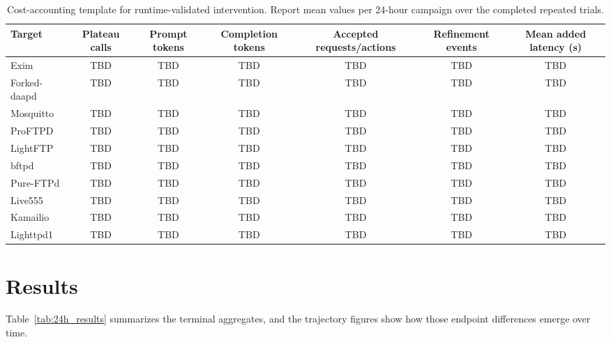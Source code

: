 \documentclass[conference]{IEEEtran}
\begin{document}
\begin{table}[t]
\centering
\caption{Cost-accounting template for runtime-validated intervention. Report mean values per 24-hour campaign over the completed repeated trials.}
\label{tab:cost_breakdown_template}
\scriptsize
\begin{tabular}{l|c c c c c c}
\toprule
Target & Plateau calls & Prompt tokens & Completion tokens & Accepted requests/actions & Refinement events & Mean added latency (s) \\
\midrule
Exim & TBD & TBD & TBD & TBD & TBD & TBD \\
Forked-daapd & TBD & TBD & TBD & TBD & TBD & TBD \\
Mosquitto & TBD & TBD & TBD & TBD & TBD & TBD \\
ProFTPD & TBD & TBD & TBD & TBD & TBD & TBD \\
LightFTP & TBD & TBD & TBD & TBD & TBD & TBD \\
bftpd & TBD & TBD & TBD & TBD & TBD & TBD \\
Pure-FTPd & TBD & TBD & TBD & TBD & TBD & TBD \\
Live555 & TBD & TBD & TBD & TBD & TBD & TBD \\
Kamailio & TBD & TBD & TBD & TBD & TBD & TBD \\
Lighttpd1 & TBD & TBD & TBD & TBD & TBD & TBD \\
\bottomrule
\end{tabular}
\normalsize
\end{table}
\fi

\section{Results}

Table~\ref{tab:24h_results} summarizes the terminal aggregates, and the trajectory figures show how those endpoint differences emerge over time.
\end{document}
